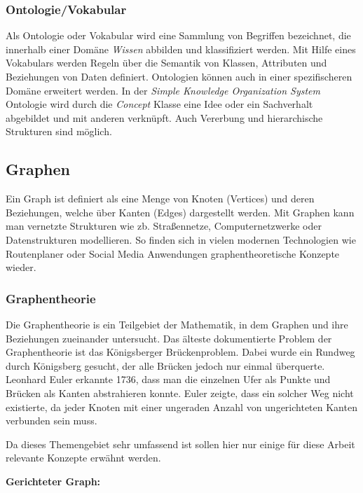 \subsubsection{Ontologie/Vokabular}

Als Ontologie oder Vokabular wird eine Sammlung von Begriffen bezeichnet, die innerhalb einer Domäne \textit{Wissen} abbilden und klassifiziert werden. \cite{w3c} Mit Hilfe eines Vokabulars werden Regeln über die Semantik von Klassen, Attributen und Beziehungen von Daten definiert. Ontologien können auch in einer spezifischeren Domäne erweitert werden. In der \textit{Simple Knowledge Organization System} Ontologie wird durch die \textit{Concept} Klasse eine Idee oder ein Sachverhalt abgebildet und mit anderen verknüpft. Auch Vererbung und hierarchische Strukturen sind möglich.



\subsection{Graphen}

Ein Graph ist definiert als eine Menge von Knoten (Vertices) und deren Beziehungen, welche über Kanten (Edges) dargestellt werden. Mit Graphen kann man vernetzte Strukturen wie zb. Straßennetze, Computernetzwerke oder Datenstrukturen modellieren. So finden sich in vielen modernen Technologien wie Routenplaner oder Social Media Anwendungen graphentheoretische Konzepte wieder.
	\subsubsection{Graphentheorie}
	Die Graphentheorie is ein Teilgebiet der Mathematik, in dem Graphen und ihre Beziehungen zueinander untersucht. Das älteste dokumentierte Problem der Graphentheorie ist das Königsberger Brückenproblem. Dabei wurde ein Rundweg durch Königsberg gesucht, der alle Brücken jedoch nur einmal überquerte. Leonhard Euler erkannte 1736, dass man die einzelnen Ufer als Punkte und Brücken als Kanten abstrahieren konnte. Euler zeigte, dass ein solcher Weg nicht existierte, da jeder Knoten mit einer ungeraden Anzahl von ungerichteten Kanten verbunden sein muss.
	\newline
	
	Da dieses Themengebiet sehr umfassend ist sollen hier nur einige für diese Arbeit relevante Konzepte erwähnt werden.\newline
	
	\textbf{Gerichteter Graph: }
	
